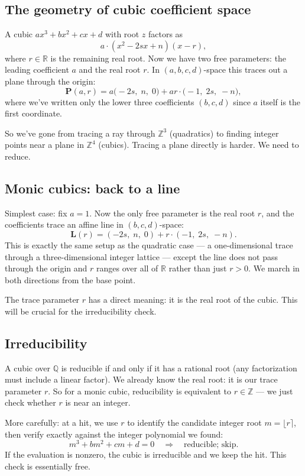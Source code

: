 \documentclass[11pt]{article}
\newcommand{\R}{\mathbb{R}}
\newcommand{\Z}{\mathbb{Z}}
\newcommand{\Q}{\mathbb{Q}}
\begin{document}
\subsection{The geometry of cubic coefficient space}

A cubic $ax^3 + bx^2 + cx + d$ with root $z$ factors as
\[
    a \cdot (x^2 - 2sx + n)(x - r),
\]
where $r \in \R$ is the remaining real root.
Now we have two free parameters: the leading coefficient $a$ and the real root $r$.
In $(a, b, c, d)$-space this traces out a plane through the origin:
\[
    \mathbf{P}(a, r) = a\bigl(-2s,\; n,\; 0\bigr) + ar \cdot \bigl(-1,\; 2s,\; -n\bigr),
\]
where we've written only the lower three coefficients $(b, c, d)$ since $a$ itself is the first coordinate.

So we've gone from tracing a ray through $\Z^3$ (quadratics) to finding integer points near a plane in $\Z^4$ (cubics).
Tracing a plane directly is harder.
We need to reduce.

\subsection{Monic cubics: back to a line}

Simplest case: fix $a = 1$.
Now the only free parameter is the real root $r$, and the coefficients trace an affine line in $(b, c, d)$-space:
\[
    \mathbf{L}(r) = (-2s,\; n,\; 0) + r \cdot (-1,\; 2s,\; -n).
\]
This is exactly the same setup as the quadratic case --- a one-dimensional trace through a three-dimensional integer lattice --- except the line does not pass through the origin and $r$ ranges over all of $\R$ rather than just $r > 0$.
We march in both directions from the base point.

The trace parameter $r$ has a direct meaning: it is the real root of the cubic.
This will be crucial for the irreducibility check.

\subsection{Irreducibility}

A cubic over $\Q$ is reducible if and only if it has a rational root (any factorization must include a linear factor).
We already know the real root: it is our trace parameter $r$.
So for a monic cubic, reducibility is equivalent to $r \in \Z$ --- we just check whether $r$ is near an integer.

More carefully: at a hit, we use $r$ to identify the candidate integer root $m = \lfloor r \rceil$, then verify exactly against the integer polynomial we found:
\[
    m^3 + bm^2 + cm + d = 0 \quad \Longrightarrow \quad \text{reducible; skip.}
\]
If the evaluation is nonzero, the cubic is irreducible and we keep the hit.
This check is essentially free.
\end{document}
